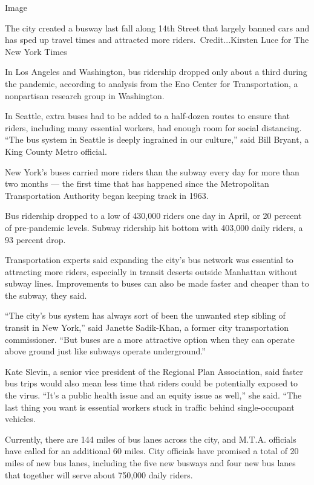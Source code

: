Image

The city created a busway last fall along 14th Street that largely
banned cars and has sped up travel times and attracted more
riders.~Credit...Kirsten Luce for The New York Times

In Los Angeles and Washington, bus ridership dropped only about a third
during the pandemic, according to analysis from the Eno Center for
Transportation, a nonpartisan research group in Washington.

In Seattle, extra buses had to be added to a half-dozen routes to ensure
that riders, including many essential workers, had enough room for
social distancing. ``The bus system in Seattle is deeply ingrained in
our culture,'' said Bill Bryant, a King County Metro official.

New York's buses carried more riders than the subway every day for more
than two months --- the first time that has happened since the
Metropolitan Transportation Authority began keeping track in 1963.

Bus ridership dropped to a low of 430,000 riders one day in April, or 20
percent of pre-pandemic levels. Subway ridership hit bottom with 403,000
daily riders, a 93 percent drop.

Transportation experts said expanding the city's bus network was
essential to attracting more riders, especially in transit deserts
outside Manhattan without subway lines. Improvements to buses can also
be made faster and cheaper than to the subway, they said.

``The city's bus system has always sort of been the unwanted step
sibling of transit in New York,'' said Janette Sadik-Khan, a former city
transportation commissioner. ``But buses are a more attractive option
when they can operate above ground just like subways operate
underground.''

Kate Slevin, a senior vice president of the Regional Plan Association,
said faster bus trips would also mean less time that riders could be
potentially exposed to the virus. ``It's a public health issue and an
equity issue as well,'' she said. ``The last thing you want is essential
workers stuck in traffic behind single-occupant vehicles.

Currently, there are 144 miles of bus lanes across the city, and M.T.A.
officials have called for an additional 60 miles. City officials have
promised a total of 20 miles of new bus lanes, including the five new
busways and four new bus lanes that together will serve about 750,000
daily riders.


